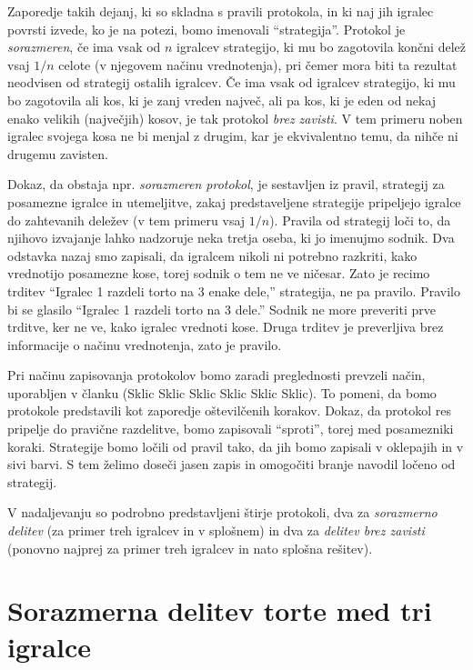 \documentclass[a4paper,12pt]{article}
\begin{document}
Zaporedje takih dejanj, ki so skladna s pravili protokola, in ki naj jih igralec povrsti izvede, ko je na potezi, bomo imenovali ``strategija''. Protokol je {\em sorazmeren}, če ima vsak od $n$ igralcev strategijo, ki mu bo zagotovila končni delež vsaj $1/n$ celote (v njegovem načinu vrednotenja), pri čemer mora biti ta rezultat neodvisen od strategij ostalih igralcev. Če ima vsak od igralcev strategijo, ki mu bo zagotovila ali kos, ki je zanj vreden največ, ali pa kos, ki je eden od nekaj enako velikih (največjih) kosov, je tak protokol {\em brez zavisti}. V tem primeru noben igralec svojega kosa ne bi menjal z drugim, kar je ekvivalentno temu, da nihče ni drugemu zavisten.

Dokaz, da obstaja npr. {\em sorazmeren protokol}, je sestavljen iz pravil, strategij za posamezne igralce in utemeljitve, zakaj predstaveljene strategije pripeljejo igralce do zahtevanih deležev (v tem primeru vsaj $1/n$). Pravila od strategij loči to, da njihovo izvajanje lahko nadzoruje neka tretja oseba, ki jo imenujmo sodnik. Dva odstavka nazaj smo zapisali, da igralcem nikoli ni potrebno razkriti, kako vrednotijo posamezne kose, torej sodnik o tem ne ve ničesar. Zato je recimo trditev ``Igralec 1 razdeli torto na 3 enake dele,'' strategija, ne pa pravilo. Pravilo bi se glasilo ``Igralec 1 razdeli torto na 3 dele.'' Sodnik ne more preveriti prve trditve, ker ne ve, kako igralec vrednoti kose. Druga trditev je preverljiva brez informacije o načinu vrednotenja, zato je pravilo.

Pri načinu zapisovanja protokolov bomo zaradi preglednosti prevzeli način, uporabljen v članku (Sklic Sklic Sklic Sklic Sklic Sklic). To pomeni, da bomo protokole predstavili kot zaporedje oštevilčenih korakov. Dokaz, da protokol res pripelje do pravične razdelitve, bomo zapisovali ``sproti'', torej med posamezniki koraki. Strategije bomo ločili od pravil tako, da jih bomo zapisali v oklepajih in v sivi barvi. S tem želimo doseči jasen zapis in omogočiti branje navodil ločeno od strategij.

V nadaljevanju so podrobno predstavljeni štirje protokoli, dva za {\em sorazmerno delitev} (za primer treh igralcev in v splošnem) in dva za {\em delitev brez zavisti} (ponovno najprej za primer treh igralcev in nato splošna rešitev).


\section{Sorazmerna delitev torte med tri igralce}
\end{document}
